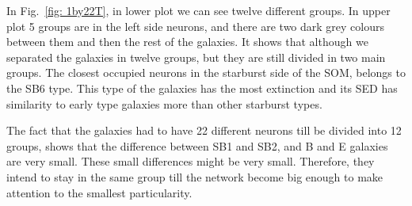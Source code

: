             In Fig.~\ref{fig: 1by22T}, in lower plot we can see twelve different groups. 
            In upper plot 5 groups are in the left side neurons, and there are two dark grey colours between them and then the rest of the galaxies. 
            It shows that although we separated the galaxies in twelve groups, but they are still divided in two main groups.
            The closest occupied neurons in the starburst side of the SOM, belongs to the SB6 type. 
            This type of the galaxies has the most extinction and its SED has similarity to early type galaxies more than other starburst types. 
            
            The fact that the galaxies had to have 22 different neurons till be divided into 12 groups, shows that the difference between SB1 and SB2, and B and E galaxies are very small.
            These small differences might be very small.
            Therefore, they intend to stay in the same group till the network become big enough to make attention to the smallest particularity.
